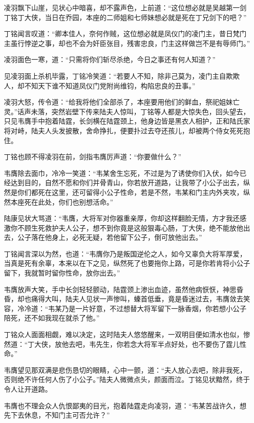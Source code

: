 凌羽飘下山崖，见状心中暗喜，却不露声色，上前道：“这位想必就是吴越第一剑丁铭丁大侠，当日在乔园，本座的二师姐和七师妹想必就是死在丁兄剑下的吧？”

丁铭闻言叹道：“卿本佳人，奈何作贼，这位想必就是凤仪门的凌门主，昔日梵门主虽行悖逆之事，却也不会为奸臣张目，残害忠良，门主这样做岂不是有辱师门。”

凌羽面色一寒，道：“只需将你们斩尽杀绝，今日之事还有何人知道？”

见凌羽面上杀机毕露，丁铭冷笑道：“若要人不知，除非己莫为，凌门主自欺欺人，却不知天下谁不知道凤仪门党附尚维钧，构陷忠良的丑事。”

凌羽大怒，传令道：“给我将他们全部杀了，本座要用他们的鲜血，祭祀姐妹亡灵。”话声未落，突然岩壁下传来陆夫人惊叫，丁铭等人都是大惊失色，回头望去，只见韦膺手中抱着陆霆，长剑横在陆霆颈上，他身边皆是黑衣人相护，正和陆氏家将对峙，陆夫人头发披散，舍命挣扎，便要扑过去夺还孩儿，却被两个侍女死死抱住。

丁铭也顾不得凌羽在前，剑指韦膺厉声道：“你要做什么？”

韦膺除去面巾，冷冷一笑道：“韦某舍生忘死，不过是为了诱使你们入伏，如今已经达到目的，自然不愿和你们并骨青山，你若放开道路，让我带了小公子出去，纵然是你们都死在这里，还可留得小公子性命，若是不然，韦某和门主内外夹攻，纵然本座死在此处，你们也别想活命。”

陆康见状大骂道：“韦膺，大将军对你器重亲厚，你却这样翻脸无情，方才我还感激你不顾生死救护夫人公子，想不到你竟是这般狠毒心肠，丁大侠，绝不能放他出去，公子落在他身上，必死无疑，若他留下公子，倒可放他出去。”

丁铭闻言深以为然，也道：“韦膺你乃是叛国逆伦之人，如今又辜负大将军厚爱，当真是死有余辜，本来以在下之见，纵然死了也要拖你上路，可是你若肯将小公子留下，我就暂时留你性命，放你出去。”

韦膺放声大笑，手中长剑轻轻颤动，陆霆颈上渗出血迹，虽然他病恹恹，神思昏昏，却也痛得大叫，陆夫人见状一声惨叫，螓首低垂，竟是昏迷过去，韦膺敛去笑容，冷冷道：“韦某乃是一片好意，不过想替大将军留下一脉香烟，你若想小公子陪死，还不如我现在就杀了他。”

丁铭众人面面相觑，难以决定，这时陆夫人悠悠醒来，一双明目便如清水也似，惨然道：“丁大侠，放他去吧，韦先生，你若念大将军半点好处，也不要伤了霆儿性命。”

韦膺望见那双满是悲伤恳切的眼睛，心中一颤，道：“夫人放心去吧，除非我死，否则绝不许任何人伤了小公子。”陆夫人微微点头，颜面而泣。丁铭见状黯然，终于令人让开道路。

韦膺也不理会众人仇恨鄙夷的目光，抱着陆霆走向凌羽，道：“韦某苦战许久，想先下去休息，不知门主可否允许？”


